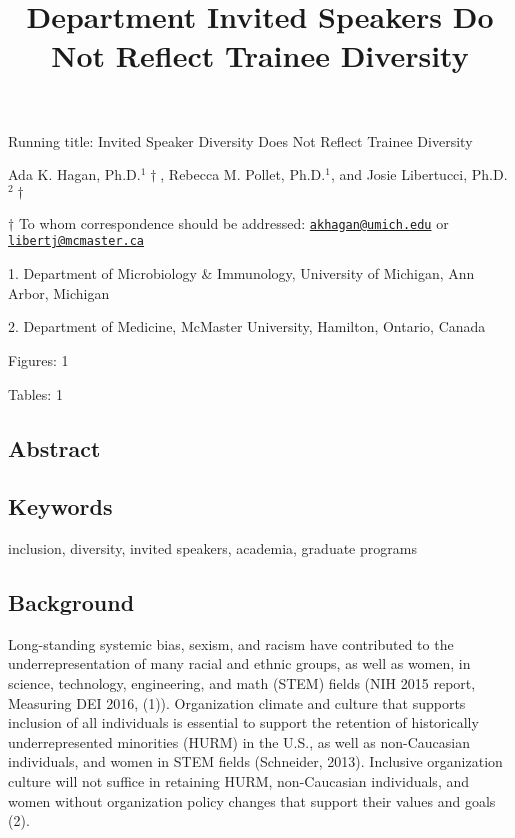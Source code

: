 \documentclass[10pt,]{article}
\title{\textbf{Department Invited Speakers Do Not Reflect Trainee Diversity}}
\author{}
\date{}
\begin{document}
\maketitle

\vspace{30mm}

Running title: Invited Speaker Diversity Does Not Reflect Trainee
Diversity

\vspace{35mm}

Ada K. Hagan, Ph.D.\({^1\dagger}\), Rebecca M. Pollet, Ph.D.\({^1}\),
and Josie Libertucci, Ph.D.\({^2\dagger}\)

\vspace{35mm}

\(\dagger\) To whom correspondence should be addressed:
\href{mailto:akhagan@umich.edu}{\nolinkurl{akhagan@umich.edu}} or
\href{mailto:libertj@mcmaster.ca}{\nolinkurl{libertj@mcmaster.ca}}

1. Department of Microbiology \& Immunology, University of Michigan, Ann
Arbor, Michigan

2. Department of Medicine, McMaster University, Hamilton, Ontario,
Canada

Figures: 1

Tables: 1

\newpage

\linenumbers

\subsection{Abstract}\label{abstract}

\subsection{Keywords}\label{keywords}

inclusion, diversity, invited speakers, academia, graduate programs

\newpage

\subsection{Background}\label{background}

Long-standing systemic bias, sexism, and racism have contributed to the
underrepresentation of many racial and ethnic groups, as well as women,
in science, technology, engineering, and math (STEM) fields (NIH 2015
report, Measuring DEI 2016, (1)). Organization climate and culture that
supports inclusion of all individuals is essential to support the
retention of historically underrepresented minorities (HURM) in the
U.S., as well as non-Caucasian individuals, and women in STEM fields
(Schneider, 2013). Inclusive organization culture will not suffice in
retaining HURM, non-Caucasian individuals, and women without
organization policy changes that support their values and goals (2).
\end{document}
